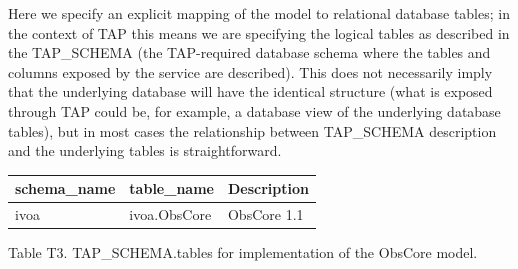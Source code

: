 \documentclass[11pt,a4paper]{ivoa}
\begin{document}
Here we specify an explicit mapping of the model to relational database tables; in the context of TAP this means we are
specifying the logical tables as described in the TAP\_SCHEMA (the TAP-required database schema where the tables and
columns exposed by the service are described).  This does not necessarily imply that the underlying database will have
the identical structure (what is exposed through TAP could be, for example, a database view of the underlying database
tables), but in most cases the relationship between TAP\_SCHEMA description and the underlying tables is
straightforward.

\begin{tabular}{|p{}|p{}|p{}|}
\hline
schema\_name & table\_name & Description\\\hline
ivoa & ivoa.ObsCore & ObsCore 1.1\\\hline 
\end{tabular}
\label{T3}Table T3. TAP\_SCHEMA.tables for implementation of the ObsCore model.
\end{document}
